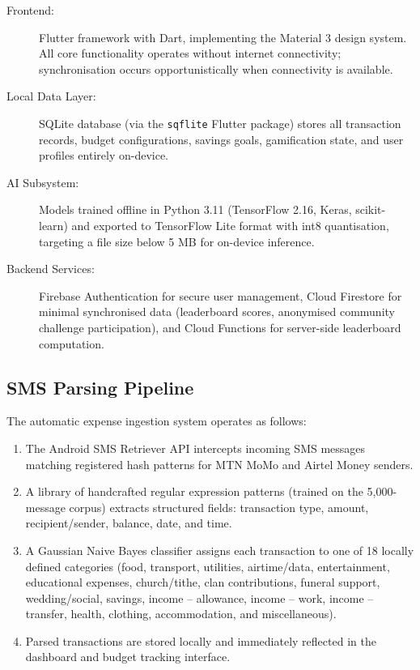\documentclass[12pt,a4paper]{report}
\begin{document}
\begin{description}
    \item[Frontend:] Flutter framework with Dart, implementing the Material 3 design system. All core functionality operates without internet connectivity; synchronisation occurs opportunistically when connectivity is available.
    \item[Local Data Layer:] SQLite database (via the \texttt{sqflite} Flutter package) stores all transaction records, budget configurations, savings goals, gamification state, and user profiles entirely on-device.
    \item[AI Subsystem:] Models trained offline in Python 3.11 (TensorFlow 2.16, Keras, scikit-learn) and exported to TensorFlow Lite format with int8 quantisation, targeting a file size below 5 MB for on-device inference.
    \item[Backend Services:] Firebase Authentication for secure user management, Cloud Firestore for minimal synchronised data (leaderboard scores, anonymised community challenge participation), and Cloud Functions for server-side leaderboard computation.
\end{description}

\subsection{SMS Parsing Pipeline}

The automatic expense ingestion system operates as follows:

\begin{enumerate}
    \item The Android SMS Retriever API intercepts incoming SMS messages matching registered hash patterns for MTN MoMo and Airtel Money senders.
    \item A library of handcrafted regular expression patterns (trained on the 5,000-message corpus) extracts structured fields: transaction type, amount, recipient/sender, balance, date, and time.
    \item A Gaussian Naive Bayes classifier assigns each transaction to one of 18 locally defined categories (food, transport, utilities, airtime/data, entertainment, educational expenses, church/tithe, clan contributions, funeral support, wedding/social, savings, income -- allowance, income -- work, income -- transfer, health, clothing, accommodation, and miscellaneous).
    \item Parsed transactions are stored locally and immediately reflected in the dashboard and budget tracking interface.
\end{enumerate}
\end{document}

